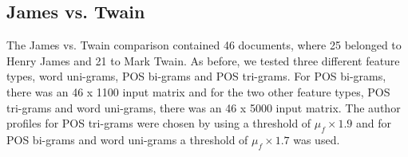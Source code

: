 \documentclass[a4paper,10pt,twoside,fleqn]{article}
\begin{document}
\subsection{James vs. Twain} \label{sec:twain-james}
The James vs. Twain comparison contained 46 documents, where
25 belonged to Henry James and 21 to  Mark Twain.
As before, we tested three different feature types, word uni-grams,
POS bi-grams and POS tri-grams.
For POS bi-grams, there was an 46 x 1100 input matrix and for
the two other feature types, POS tri-grams and word uni-grams,
there was an 46 x 5000 input matrix.
The author profiles for POS tri-grams were chosen
by using a threshold of $\mu_f \times 1.9$ and for
POS bi-grams and word uni-grams a threshold of $\mu_f \times 1.7$
was used.
\end{document}
